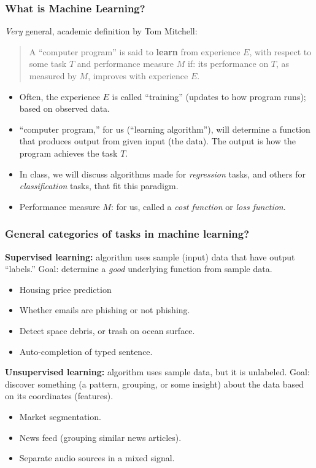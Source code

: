 \documentclass{beamer}
\theoremstyle{example}
\begin{document}
\begin{frame}
\frametitle{What is Machine Learning?}
    \textit{Very} general, academic definition by Tom Mitchell:\newline 
    \begin{quote}
        A ``computer program'' is said to \textbf{learn} from experience $E$, with respect to some task $T$ and performance measure $M$ if: its performance on $T$, as measured by $M$, improves with experience $E$.
    \end{quote}
    \pause
    \begin{itemize}
        \item Often, the experience $E$ is called ``training'' (updates to how program runs); based on observed data.
        \pause
        \item ``computer program,'' for us (``learning algorithm''), will determine a function that produces output from given input (the data). The output is how the program achieves the task $T$. 
        \pause
        \item In class, we will discuss algorithms made for \textit{regression} tasks, and others for \textit{classification} tasks, that fit this paradigm.
        \pause 
        \item Performance measure $M$: for us, called a \textit{cost function} or \textit{loss function}.
    \end{itemize}

\end{frame}

\begin{frame}
\frametitle{General categories of tasks in machine learning?}

\textbf{Supervised learning:} algorithm uses sample (input) data that have output ``labels.'' Goal: determine a \emph{good} underlying function from sample data.
\pause
    \begin{itemize}
        \item Housing price prediction
        \pause
        \item Whether emails are phishing or not phishing.
        \pause
        \item Detect space debris, or trash on ocean surface.
        \item Auto-completion of typed sentence.
    \end{itemize}
\pause
\textbf{Unsupervised learning:} algorithm uses sample data, but it is unlabeled. Goal: discover something (a pattern, grouping, or some insight) about the data based on its coordinates (features).
\pause
    \begin{itemize}
        \item Market segmentation.
        \pause
        \item News feed (grouping similar news articles).
        \pause
        \item Separate audio sources in a mixed signal.
    \end{itemize}

\end{frame}
\end{document}
